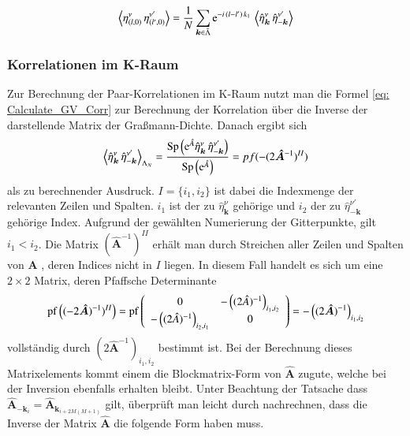 \begin{grayframe}[frametitle = {Fouriertransformierte horizontale Graßmann-Korrelationen}]
\begin{equation} \label{eq: horz_gv_pair_corr}
\left\langle \eta^{\nu}_{(l,0)}\, \eta^{\nu'}_{(l', 0)}  \right\rangle = \frac{1}{N} \sum_{\bm{k} \in \bar{\Lambda}}  \mathrm{e}^{-i\,(l- l') \,k_1} \,\left\langle \hat{\eta}_{\bm{k}}^{\nu}\, \hat{\eta}_{-\bm{k}}^{\nu'} \right\rangle
\end{equation} 
\end{grayframe}

\subsubsection{Korrelationen im K-Raum}

Zur Berechnung der Paar-Korrelationen im K-Raum nutzt man die Formel \eqref{eq: Calculate_GV_Corr} zur Berechnung der Korrelation über die Inverse der darstellende Matrix der Graßmann-Dichte. Danach ergibt sich 
\begin{equation} 
    \left\langle \hat{\eta}_{\bm{k}}^{\nu}\, \hat{\eta}_{-\bm{k}}^{\nu'} \right\rangle_{\Lambda_N} = \frac{\mathrm{Sp}\left( \mathrm{e}^{\hat{A}}\hat{\eta}_{\bm{k}}^{\nu}\, \hat{\eta}_{-\bm{k}}^{\nu'} \right)}{\mathrm{Sp}\left( \mathrm{e}^{\hat{A}} \right)} = pf(-(2\bm{\hat{A}}^{-1})^{II}) 
\end{equation} 
als zu berechnender Ausdruck. $I = \{i_{1}, i_{2} \} $ ist dabei die Indexmenge der relevanten Zeilen und Spalten. $i_{1}$ ist der zu $ \hat{\eta}_{\bm{k}}^{\nu} $ gehörige  und $i_{2}$ der zu $\hat{\eta}_{-\bm{k}}^{\nu'}$ gehörige Index. Aufgrund der gewählten Numerierung der Gitterpunkte, gilt $i_{1} < i_2$. Die Matrix $(\bm{\hat{A}}^{-1})^{II}$ erhält man durch Streichen aller Zeilen und Spalten von $\bm{A}$ , deren Indices nicht in $I$ liegen. In diesem Fall handelt es sich um eine $2\times2$ Matrix,  deren Pfaffsche Determinante
\begin{equation}
 \mathrm{pf}\left( (-2\bm{\hat{A}})^{-1})^{II} \right) = \mathrm{pf}\left( \begin{array}{cc} 
        0 & -\left((2\hat{A})^{-1}\right)_{i_1,i_2}     \\
        -\left((2\hat{A})^{-1}\right)_{i_2,i_1} & 0
    \end{array} \right) 
    = -\left((2\bm{\hat{A}})^{-1}\right)_{i_1,i_2}
\end{equation}
vollständig durch $(2\bm{\hat{A}}^{-1})_{i_1,i_2}$ bestimmt ist. Bei der Berechnung dieses Matrixelements kommt einem die Blockmatrix-Form von $\bm{\hat{A}}$ zugute, welche bei der Inversion ebenfalls erhalten bleibt. Unter Beachtung der Tatsache dass $\bm{\hat{A}}_{-\bm{k}_i} = \bm{\hat{A}}_{\bm{k}_{i+2M(M+1)}}$  gilt, überprüft man leicht durch nachrechnen, dass die Inverse der Matrix $\bm{\hat{A}}$ die folgende Form haben muss. 
